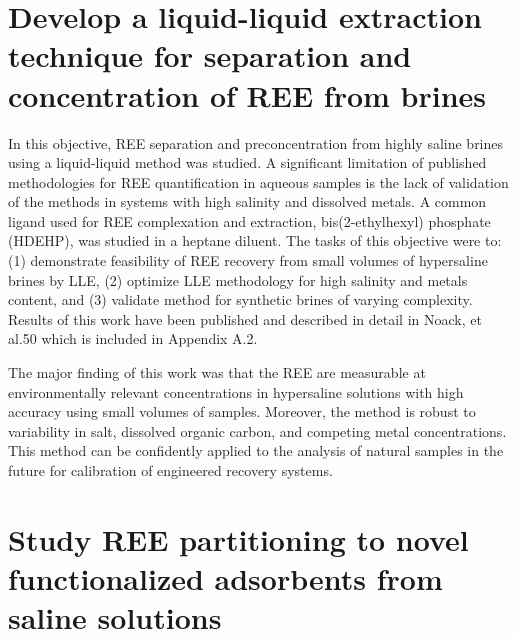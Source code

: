 \section{Develop a liquid-liquid extraction technique for separation and concentration of REE from brines}

In this objective, REE separation and preconcentration from highly saline brines using a liquid-liquid method was studied.
A significant limitation of published methodologies for REE quantification in aqueous samples is the lack of validation of the methods in systems with high salinity and dissolved metals.
A common ligand used for REE complexation and extraction, bis(2-ethylhexyl) phosphate (HDEHP), was studied in a heptane diluent. 
The tasks of this objective were to: (1) demonstrate feasibility of REE recovery from small volumes of hypersaline brines by LLE, (2) optimize LLE methodology for high salinity and metals content, and (3) validate method for synthetic brines of varying complexity.
Results of this work have been published and described in detail in Noack, et al.50 which is included in Appendix A.2.

The major finding of this work was that the REE are measurable at environmentally relevant concentrations in hypersaline solutions with high accuracy using small volumes of samples.
Moreover, the method is robust to variability in salt, dissolved organic carbon, and competing metal concentrations.
This method can be confidently applied to the analysis of natural samples in the future for calibration of engineered recovery systems.

\section{Study REE partitioning to novel functionalized adsorbents from saline solutions}